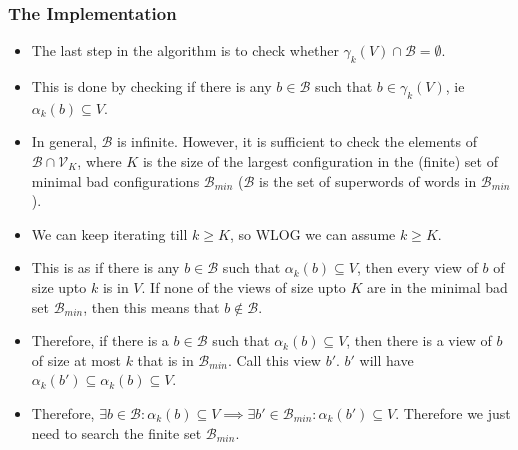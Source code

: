 \documentclass{beamer}
\begin{document}
{        \begin{frame}
            \frametitle{The Implementation}
            \begin{itemize}
                \item The last step in the algorithm is to check whether $\gamma_{k}(V) \cap \mathcal{B} = \emptyset$.
                \item This is done by checking if there is any $b \in \mathcal{B}$ such that $b \in \gamma_{k}(V)$, ie $\alpha_{k}(b) \subseteq V$.
                \item In general, $\mathcal{B}$ is infinite. However, it is sufficient to check the elements of $\mathcal{B} \cap \mathcal{V}_{K}$, where $K$ is the size of the largest configuration in the (finite) set of minimal bad configurations $\mathcal{B}_{min}$ ($\mathcal{B}$ is the set of superwords of words in $\mathcal{B}_{min}$). 
                \item We can keep iterating till $k \geq K$, so WLOG we can assume $k \geq K$.
                \item This is as if there is any $b \in \mathcal{B}$ such that $\alpha_{k}(b) \subseteq V$, then every view of $b$ of size upto $k$ is in $V$. If none of the views of size upto $K$ are in the minimal bad set $\mathcal{B}_{min}$, then this means that $b \notin \mathcal{B}$. 
                \item Therefore, if there is a $b \in \mathcal{B}$ such that $\alpha_{k}(b) \subseteq V$, then there is a view of $b$ of size at most $k$ that is in $\mathcal{B}_{min}$. Call this view $b'$. $b'$ will have $\alpha_{k}(b') \subseteq \alpha_{k}(b) \subseteq V$.
                \item Therefore, $\exists b \in \mathcal{B}: \alpha_{k}(b) \subseteq V \implies \exists b' \in \mathcal{B}_{min}: \alpha_{k}(b') \subseteq V$. Therefore we just need to search the finite set $\mathcal{B}_{min}$.
            \end{itemize}
        \end{frame}

        


}
\end{document}

